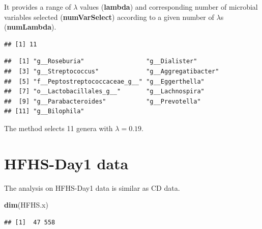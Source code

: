\documentclass[openany]{book}
\newenvironment{Shaded}{\begin{snugshade}}{\end{snugshade}}
\newcommand{\KeywordTok}[1]{\textcolor[rgb]{0.13,0.29,0.53}{\textbf{#1}}}
\newcommand{\DataTypeTok}[1]{\textcolor[rgb]{0.13,0.29,0.53}{#1}}
\newcommand{\FloatTok}[1]{\textcolor[rgb]{0.00,0.00,0.81}{#1}}
\newcommand{\StringTok}[1]{\textcolor[rgb]{0.31,0.60,0.02}{#1}}
\newcommand{\OperatorTok}[1]{\textcolor[rgb]{0.81,0.36,0.00}{\textbf{#1}}}
\newcommand{\NormalTok}[1]{#1}
\begin{document}
It provides a range of \(\lambda\) values (\textbf{lambda}) and
corresponding number of microbial variables selected
(\textbf{numVarSelect}) according to a given number of \(\lambda\)s
(\textbf{numLambda}).

\begin{Shaded}
\end{Shaded}

\begin{verbatim}
## [1] 11
\end{verbatim}

\begin{Shaded}
\end{Shaded}

\begin{verbatim}
##  [1] "g__Roseburia"                 "g__Dialister"                
##  [3] "g__Streptococcus"             "g__Aggregatibacter"          
##  [5] "f__Peptostreptococcaceae_g__" "g__Eggerthella"              
##  [7] "o__Lactobacillales_g__"       "g__Lachnospira"              
##  [9] "g__Parabacteroides"           "g__Prevotella"               
## [11] "g__Bilophila"
\end{verbatim}

The method selects 11 genera with \(\lambda = 0.19\).

\section{HFHS-Day1 data}\label{hfhs-day1-data}

The analysis on HFHS-Day1 data is similar as CD data.

\begin{Shaded}
\begin{Highlighting}[]
\KeywordTok{dim}\NormalTok{(HFHS.x)}
\end{Highlighting}
\end{Shaded}

\begin{verbatim}
## [1]  47 558
\end{verbatim}
\end{document}
